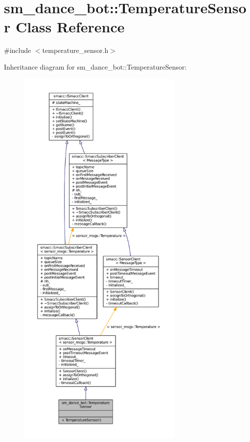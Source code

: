 \hypertarget{classsm__dance__bot_1_1TemperatureSensor}{}\section{sm\+\_\+dance\+\_\+bot\+:\+:Temperature\+Sensor Class Reference}
\label{classsm__dance__bot_1_1TemperatureSensor}


{\ttfamily \#include $<$temperature\+\_\+sensor.\+h$>$}



Inheritance diagram for sm\+\_\+dance\+\_\+bot\+:\+:Temperature\+Sensor\+:
\nopagebreak
\begin{figure}[H]
\begin{center}
\leavevmode
\includegraphics[height=550pt]{classsm__dance__bot_1_1TemperatureSensor__inherit__graph}
\end{center}
\end{figure}


